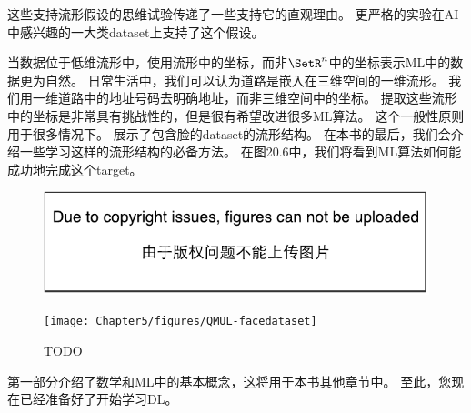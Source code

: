 
这些支持流形假设的思维试验传递了一些支持它的直观理由。
更严格的实验\citep{Cayton-2005,Narayanan+Mitter-NIPS2010,Scholkopf98-book,Roweis2000-lle-small,Tenenbaum2000-isomap,Brand2003,Belkin+Niyogi-nips2003,Donoho+Carrie-03,Weinberger04a}在\gls{AI}中感兴趣的一大类\gls{dataset}上支持了这个假设。

当数据位于低维流形中，使用流形中的坐标，而非$\SetR^n$中的坐标表示\gls{ML}中的数据更为自然。
日常生活中，我们可以认为道路是嵌入在三维空间的一维流形。
我们用一维道路中的地址号码去明确地址，而非三维空间中的坐标。
提取这些流形中的坐标是非常具有挑战性的，但是很有希望改进很多\gls{ML}算法。
这个一般性原则用于很多情况下。
展示了包含脸的\gls{dataset}的流形结构。
在本书的最后，我们会介绍一些学习这样的流形结构的必备方法。
在图20.6中，我们将看到\gls{ML}算法如何能成功地完成这个\gls{target}。

\begin{figure}[!htb]
\ifOpenSource
\centerline{\includegraphics{figure.pdf}}
\else
\centerline{\texttt{[image: Chapter5/figures/QMUL-facedataset]}}
\fi
\caption{TODO}
\label{fig:chap5_QMUL-facedataset}
\end{figure}

第一部分介绍了数学和\gls{ML}中的基本概念，这将用于本书其他章节中。
至此，您现在已经准备好了开始学习\gls{DL}。




